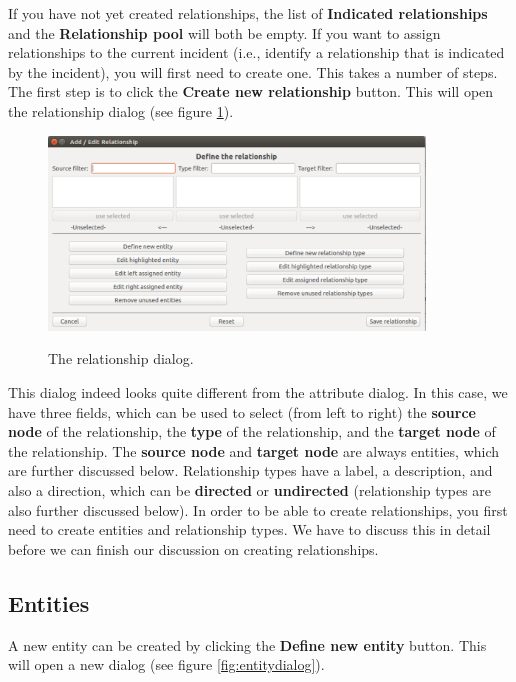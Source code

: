 \documentclass{memoir}
\begin{document}
If you have not yet created relationships, the list of \textbf{Indicated relationships} and the \textbf{Relationship pool} will both be empty. If you want to assign relationships to the current incident (i.e., identify a relationship that is indicated by the incident), you will first need to create one. This takes a number of steps. The first step is to click the \textbf{Create new relationship} button. This will open the relationship dialog (see figure \ref{fig:relationshipdialog}).

\begin{figure}[h!]
  \centering
  \caption{The relationship dialog.}
  \includegraphics[width=100mm]{Screenshot_15.pdf}
  \label{fig:relationshipdialog}
\end{figure}

This dialog indeed looks quite different from the attribute dialog. In this case, we have three fields, which can be used to select (from left to right) the \textbf{source node} of the relationship, the \textbf{type} of the relationship, and the \textbf{target node} of the relationship. The \textbf{source node} and \textbf{target node} are always entities, which are further discussed below. Relationship types have a label, a description, and also a direction, which can be \textbf{directed} or \textbf{undirected} (relationship types are also further discussed below). In order to be able to create relationships, you first need to create entities and relationship types. We have to discuss this in detail before we can finish our discussion on creating relationships.

\subsection{Entities}
\label{sec:entities}

A new entity can be created by clicking the \textbf{Define new entity} button. This will open a new dialog (see figure \ref{fig:entitydialog}).
\end{document}
